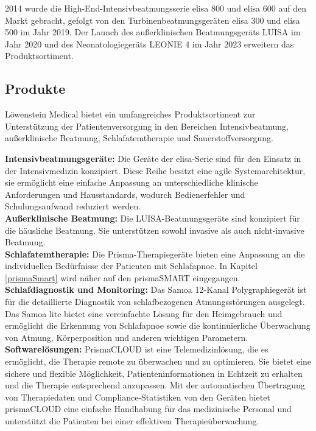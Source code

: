 \documentclass[a4paper, 12pt]{article}
\begin{document}
2014 wurde die High-End-Intensivbeatmungsserie elisa 800 und elisa 600 auf den Markt gebracht, gefolgt von den Turbinenbeatmungsgeräten elisa 300 und elisa 500 im Jahr 2019. Der Launch des außerklinischen Beatmungsgeräts LUISA im Jahr 2020 und des Neonatologiegeräts LEONIE 4 im Jahr 2023 erweitern das Produktsortiment. \cite{loewenstein}


\subsection{Produkte}\label{products} 
Löwenstein Medical bietet ein umfangreiches Produktsortiment zur Unterstützung der Patientenversorgung in den Bereichen Intensivbeatmung, außerklinische Beatmung, Schlafatemtherapie und Sauerstoffversorgung. 

\textbf{Intensivbeatmungsgeräte:} Die Geräte der elisa-Serie sind für den Einsatz in der Intensivmedizin konzipiert. Diese Reihe besitzt eine agile Systemarchitektur, sie ermöglicht eine einfache Anpassung an unterschiedliche klinische Anforderungen und Hausstandards, wodurch Bedienerfehler und Schulungsaufwand reduziert werden. \\

\textbf{Außerklinische Beatmung:} Die LUISA-Beatmungsgeräte sind konzipiert für die häusliche Beatmung. Sie unterstützen sowohl invasive als auch nicht-invasive Beatmung. \\

\textbf{Schlafatemtherapie:} Die Prisma-Therapiegeräte bieten eine Anpassung an die individuellen Bedürfnisse der Patienten mit Schlafapnoe. In Kapitel \ref{prismaSmart} wird näher auf den prismaSMART eingegangen. \\

\textbf{Schlafdiagnostik und Monitoring:} Das Samoa 12-Kanal Polygraphiegerät ist für die detaillierte Diagnostik von schlafbezogenen Atmungsstörungen ausgelegt. Das Samoa lite bietet eine vereinfachte Lösung für den Heimgebrauch und ermöglicht die Erkennung von Schlafapnoe sowie die kontinuierliche Überwachung von Atmung, Körperposition und anderen wichtigen Parametern. \\

\textbf{Softwarelösungen:} PrismaCLOUD ist eine Telemedizinlösung, die es ermöglicht, die Therapie remote zu überwachen und zu optimieren. Sie bietet eine sichere und flexible Möglichkeit, Patienteninformationen in Echtzeit zu erhalten und die Therapie entsprechend anzupassen. Mit der automatischen Übertragung von Therapiedaten und Compliance-Statistiken von den Geräten bietet prismaCLOUD eine einfache Handhabung für das medizinische Personal und unterstützt die Patienten bei einer effektiven Therapieüberwachung.
\end{document}
